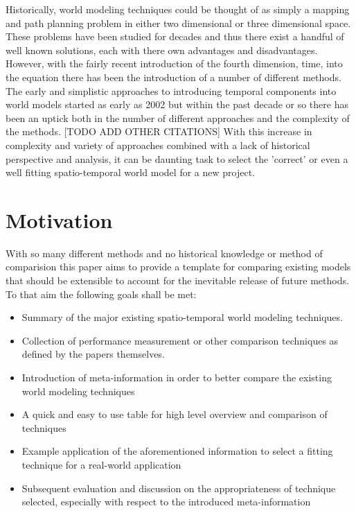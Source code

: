Historically, world modeling techniques could be thought of as simply a mapping
and path planning problem in either two dimensional or three dimensional space.
These problems have been studied for decades and thus there exist a handful of
well known solutions, each with there own advantages and disadvantages. However,
with the fairly recent introduction of the fourth dimension, time, into the
equation there has been the introduction of a number of different methods. \\

The early and simplistic approaches to introducing temporal components into
world models started as early as 2002 \cite{Arbuckle2002}
but within the past decade or so there has been an uptick
both in the number of different approaches and the complexity of the methods.
\cite{Krajnik2017} [TODO ADD OTHER CITATIONS]
With this increase in complexity and variety of approaches combined with a
lack of historical perspective and analysis, it can be daunting task to select
the 'correct' or even a well fitting spatio-temporal world model for a new
project.


\section{ Motivation }

With so many different methods and no historical knowledge or method of comparision
this paper aims to provide a template for comparing existing models that should
be extensible to account for the inevitable release of future methods. To that
aim the following goals shall be met:

\begin{itemize}
  \item Summary of the major existing spatio-temporal world modeling techniques.

  \item Collection of performance measurement or other comparison techniques as
    defined by the papers themselves.

  \item Introduction of meta-information in order to better compare the existing
    world modeling techniques

  \item A quick and easy to use table for high level overview and comparison of techniques

  \item Example application of the aforementioned information to select a fitting
    technique for a real-world application

  \item Subsequent evaluation and discussion on the appropriateness of technique
    selected, especially with respect to the introduced meta-information

\end{itemize}

